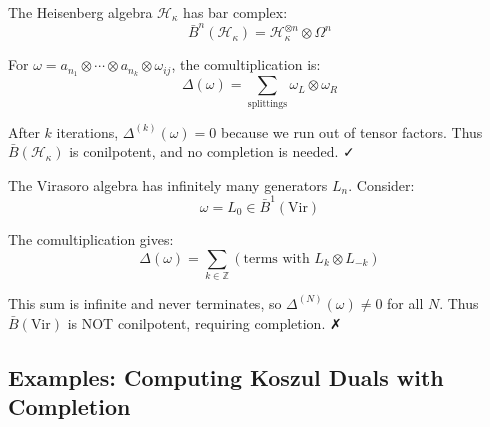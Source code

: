 \begin{example}
\label{ex:heisenberg-conilpotent-complete}
The Heisenberg algebra $\mathcal{H}_\kappa$ has bar complex:
\begin{equation}
\bar{B}^n(\mathcal{H}_\kappa) = \mathcal{H}_\kappa^{\otimes n} \otimes \Omega^n
\end{equation}

For $\omega = a_{n_1} \otimes \cdots \otimes a_{n_k} \otimes \omega_{ij}$, the 
comultiplication is:
\begin{equation}
\Delta(\omega) = \sum_{\text{splittings}} \omega_L \otimes \omega_R
\end{equation}

After $k$ iterations, $\Delta^{(k)}(\omega) = 0$ because we run out of tensor factors. 
Thus $\bar{B}(\mathcal{H}_\kappa)$ is conilpotent, and no completion is needed. ✓
\end{example}

\begin{example}
\label{ex:virasoro-not-conilpotent}
The Virasoro algebra has infinitely many generators $L_n$. Consider:
\begin{equation}
\omega = L_0 \in \bar{B}^1(\text{Vir})
\end{equation}

The comultiplication gives:
\begin{equation}
\Delta(\omega) = \sum_{k \in \mathbb{Z}} (\text{terms with } L_k \otimes L_{-k})
\end{equation}

This sum is infinite and never terminates, so $\Delta^{(N)}(\omega) \neq 0$ for all $N$. 
Thus $\bar{B}(\text{Vir})$ is NOT conilpotent, requiring completion. ✗
\end{example}

\subsection{Examples: Computing Koszul Duals with Completion}
\label{sec:koszul-duals-completion-examples}

